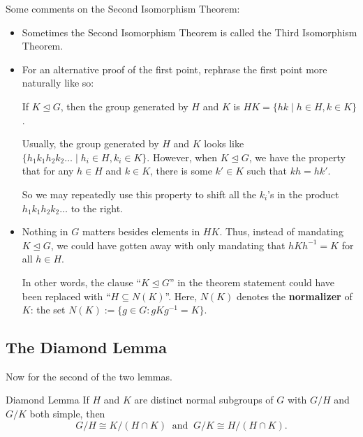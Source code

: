 Some comments on the Second Isomorphism Theorem:
\begin{itemize}
    \item[\textbf{(\#1)}] Sometimes the Second Isomorphism Theorem is called the Third Isomorphism Theorem.
    \item[\textbf{(\#2)}] For an alternative proof of the first point, rephrase the first point more naturally like so:
    \begin{center}
        If $K \unlhd G$, then the group generated by $H$ and $K$ is $HK = \{hk \mid h \in H, k \in K\}$.
    \end{center}
    Usually, the group generated by $H$ and $K$ looks like $\{h_1k_1h_2k_2\dots \mid h_i \in H, k_i \in K\}$.  However, when $K \unlhd G$, we have the property that for any $h \in H$ and $k \in K$, there is some $k' \in K$ such that $kh = hk'$.
    
    So we may repeatedly use this property to shift all the $k_i$'s in the product $h_1k_1h_2k_2\dots$ to the right.
    \item[\textbf{(\#3)}] Nothing in $G$ matters besides elements in $HK$.  Thus, instead of mandating $K \unlhd G$, we could have gotten away with only mandating that $hKh^{-1} = K$ for all $h \in H$.

    In other words, the clause ``$K \unlhd G$'' in the theorem statement could have been replaced with ``$H \subseteq N(K)$''.  Here, $N(K)$ denotes the \textbf{normalizer} of $K$: the set $N(K) := \{g \in G: gKg^{-1} = K\}$.
\end{itemize}

\subsection{The Diamond Lemma}

Now for the second of the two lemmas.

\begin{theorem}{Diamond Lemma}
    If $H$ and $K$ are distinct normal subgroups of $G$ with $G / H$ and $G / K$ both simple, then \vspace{-0.05cm}
    \[ G / H \cong K / (H \cap K) ~ \text{ and } ~ G / K \cong H / (H \cap K). \] \vspace{-0.8cm}
\end{theorem}

